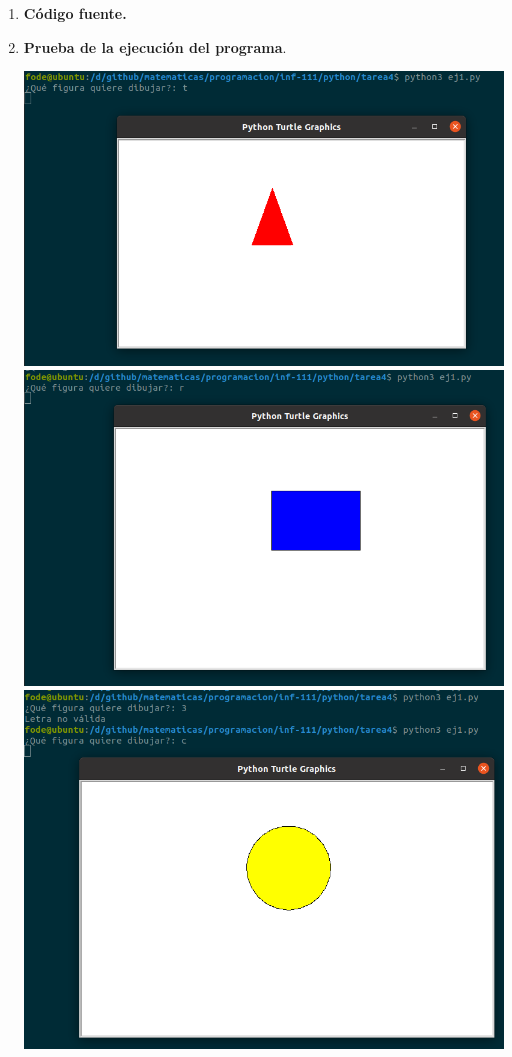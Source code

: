 \begin{enumerate}
\begin{enumerate}[\bfseries a)]
    \item \textbf{Código fuente.}\\ 
	
	
	\vspace{3cm}
    
    \item \textbf{Prueba de la ejecución del programa}.\\
	\begin{center}
	    \includegraphics[scale=.5]{imagenes/tarea4/ej1_1.png}
	    \includegraphics[scale=.5]{imagenes/tarea4/ej1_2.png}
	    \includegraphics[scale=.5]{imagenes/tarea4/ej1_3.png}

\end{center}
\end{enumerate}
\end{enumerate}
